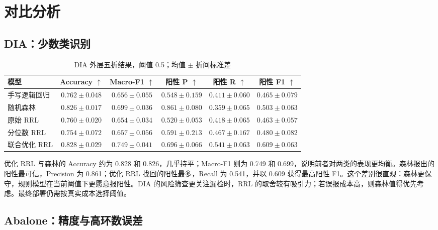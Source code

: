 \documentclass[UTF8,a4paper,11pt]{ctexart}
\begin{document}
\section{对比分析}
\subsection{DIA：少数类识别}

\begin{table}[H]
\centering
\caption{DIA 外层五折结果，阈值 0.5；均值 $\pm$ 折间标准差}
\label{tab:dia-results}
\begingroup\footnotesize\setlength{\tabcolsep}{2.5pt}
\begin{tabular}{@{}lccccc@{}}
\toprule
模型 & Accuracy $\uparrow$ & Macro-F1 $\uparrow$ & 阳性 P $\uparrow$ & 阳性 R $\uparrow$ & 阳性 F1 $\uparrow$\\
\midrule
手写逻辑回归 & $0.762\pm0.048$ & $0.656\pm0.055$ & $0.548\pm0.159$ & $0.411\pm0.060$ & $0.465\pm0.079$\\
随机森林 & $0.826\pm0.017$ & $0.699\pm0.036$ & $\mathbf{0.861\pm0.080}$ & $0.359\pm0.065$ & $0.503\pm0.063$\\
原始 RRL & $0.760\pm0.020$ & $0.654\pm0.034$ & $0.520\pm0.053$ & $0.418\pm0.065$ & $0.463\pm0.057$\\
分位数 RRL & $0.754\pm0.072$ & $0.657\pm0.056$ & $0.591\pm0.213$ & $0.467\pm0.167$ & $0.480\pm0.082$\\
联合优化 RRL & $\mathbf{0.828\pm0.029}$ & $\mathbf{0.749\pm0.041}$ & $0.696\pm0.066$ & $\mathbf{0.541\pm0.063}$ & $\mathbf{0.609\pm0.063}$\\
\bottomrule
\end{tabular}
\endgroup
\end{table}

优化 RRL 与森林的 Accuracy 约为 0.828 和 0.826，几乎持平；Macro-F1 则为 0.749 和 0.699，说明前者对两类的表现更均衡。森林报出的阳性最可信，Precision 为 0.861；优化 RRL 找回的阳性最多，Recall 为 0.541，并以 0.609 获得最高阳性 F1。这个差别很直观：森林更保守，规则模型在当前阈值下更愿意报阳性。DIA 的风险筛查更关注漏检时，RRL 的取舍较有吸引力；若误报成本高，则森林值得优先考虑。最终部署仍需按真实成本选择阈值。

\subsection{Abalone：精度与高环数误差}
\end{document}
